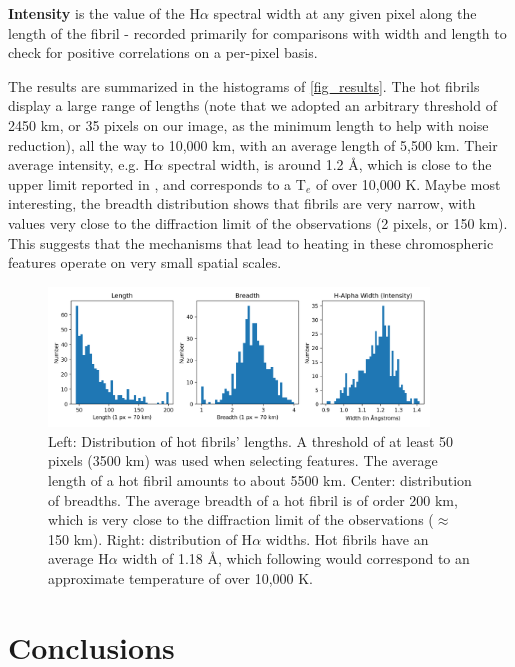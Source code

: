 \documentclass{iau}
\begin{document}
\textbf{Intensity} is the value of the H$\alpha$ spectral width at any given pixel along the length of the fibril - recorded primarily for comparisons with width and length to check for positive correlations on a per-pixel basis. 

The results are summarized in the histograms of \autoref{fig_results}. The hot fibrils display a large range of lengths (note that we adopted an arbitrary
 threshold of 2450 km, or 35 pixels on our image, as the minimum length to help with noise reduction), all the way to 10,000 km, with an average length of 5,500 km. Their average intensity, e.g. H$\alpha$ spectral width, is around 1.2 \AA, which is close to the upper limit reported in \citet{2019ApJ...881...99M}, and corresponds to a T$_e$ of over 10,000 K. Maybe most interesting, the breadth distribution shows that fibrils are very narrow, with values very close to the diffraction limit of the observations (2 pixels, or 150 km). This suggests that the mechanisms that lead to heating in these chromospheric features operate on very small spatial scales.

\begin{figure}[h]
\begin{center}
 \includegraphics[width=0.9\textwidth]{results.png} 
 \caption{Left: Distribution of hot fibrils' lengths. A threshold of at least 50 pixels (3500 km) was used when selecting features. The average length of a hot fibril amounts to about 5500 km. Center: distribution of breadths. The average breadth of a hot fibril is of order 200 km, which is very close to the diffraction limit of the observations ($\approx$150 km). Right: distribution of H$\alpha$ widths. Hot fibrils have an average H$\alpha$ width of  1.18 \AA, which following \cite{2019ApJ...881...99M} would correspond to an approximate temperature of over 10,000 K.} \label{fig_results}
\end{center}
\end{figure}


\section {Conclusions} 
\end{document}
